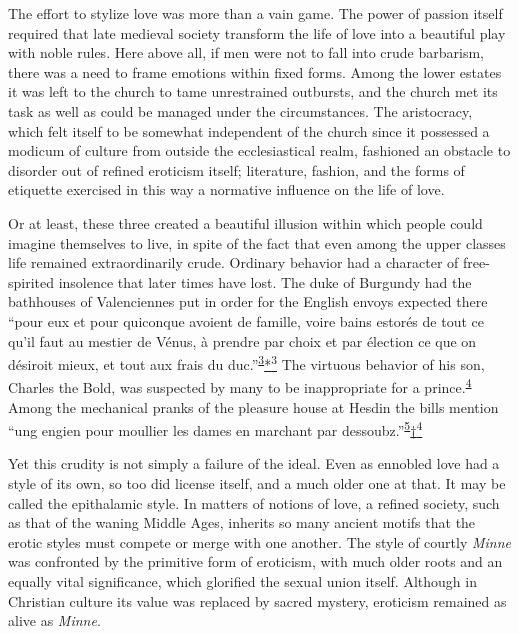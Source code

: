 The effort to stylize love was more than a vain game. The power of
passion itself required that late medieval society transform the life of
love into a beautiful play with noble rules. Here above all, if men were
not to fall into crude barbarism, there was a need to frame emotions
within fixed forms. Among the lower estates it was left to the church to
tame unrestrained outbursts, and the church met its task as well as
could be managed under the circumstances. The aristocracy, which felt
itself to be somewhat independent of the church since it possessed a
modicum of culture from outside the ecclesiastical realm, fashioned an
obstacle to disorder out of refined eroticism itself; literature,
fashion, and the forms of etiquette exercised in this way a normative
influence on the life of love.

Or at least, these three created a beautiful illusion within which
people could imagine themselves to live, in spite of the fact that even
among the upper classes life remained extraordinarily crude. Ordinary
behavior had a character of free-spirited insolence that later times
have lost. The duke of Burgundy had the bathhouses of Valenciennes put
in order for the English envoys expected there ``pour eux et pour
quiconque avoient de famille, voire bains estorés de tout ce qu'il faut
au mestier de Vénus, à prendre par choix et par élection ce que on
désiroit mieux, et tout aux frais du
duc.''\textsuperscript{\protect\hypertarget{11_Chapter_Four__THE_FORMS_OF_LOVE.xhtmlux5cux23id_1482}{\protect\hyperlink{23_NOTES.xhtmlux5cux23id_1483}{3}}}\protect\hypertarget{11_Chapter_Four__THE_FORMS_OF_LOVE.xhtmlux5cux23id_3105}{\protect\hyperlink{23_NOTES.xhtmlux5cux23id_3106}{*\textsuperscript{3}}}
The virtuous behavior of his son, Charles the Bold, was suspected by
many to be inappropriate for a
prince.\textsuperscript{\protect\hypertarget{11_Chapter_Four__THE_FORMS_OF_LOVE.xhtmlux5cux23id_1480}{\protect\hyperlink{23_NOTES.xhtmlux5cux23id_1481}{4}}}
Among the mechanical pranks of the pleasure house at Hesdin the bills
mention ``ung engien pour moullier les dames en marchant par
dessoubz.''\textsuperscript{\protect\hypertarget{11_Chapter_Four__THE_FORMS_OF_LOVE.xhtmlux5cux23id_1478}{\protect\hyperlink{23_NOTES.xhtmlux5cux23id_1479}{5}}}\protect\hypertarget{11_Chapter_Four__THE_FORMS_OF_LOVE.xhtmlux5cux23id_3107}{\protect\hyperlink{23_NOTES.xhtmlux5cux23id_3108}{†\textsuperscript{4}}}

Yet this crudity is not simply a failure of the ideal. Even as
\protect\hypertarget{11_Chapter_Four__THE_FORMS_OF_LOVE.xhtmlux5cux23page_129}{}{}ennobled
love had a style of its own, so too did license itself, and a much older
one at that. It may be called the epithalamic style. In matters of
notions of love, a refined society, such as that of the waning Middle
Ages, inherits so many ancient motifs that the erotic styles must
compete or merge with one another. The style of courtly \emph{Minne} was
confronted by the primitive form of eroticism, with much older roots and
an equally vital significance, which glorified the sexual union itself.
Although in Christian culture its value was replaced by sacred mystery,
eroticism remained as alive as \emph{Minne}.

